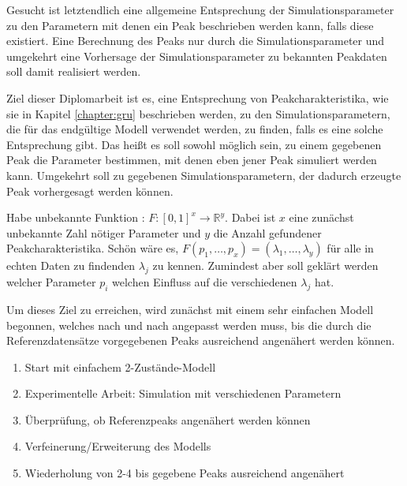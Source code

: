 
Gesucht ist letztendlich eine allgemeine Entsprechung der Simulationsparameter zu den Parametern mit denen ein Peak beschrieben werden kann, falls diese existiert. Eine Berechnung des Peaks nur durch die Simulationsparameter und umgekehrt eine Vorhersage der Simulationsparameter zu bekannten Peakdaten soll damit realisiert werden.

Ziel dieser Diplomarbeit ist es, eine Entsprechung von Peakcharakteristika, wie sie in Kapitel \ref{chapter:gru} beschrieben werden, zu den Simulationsparametern, die für das endgültige Modell verwendet werden, zu finden, falls es eine solche Entsprechung gibt.
Das heißt es soll sowohl möglich sein, zu einem gegebenen Peak die Parameter bestimmen, mit denen eben jener Peak simuliert werden kann. Umgekehrt soll zu gegebenen Simulationsparametern, der dadurch erzeugte Peak vorhergesagt werden können.
 
Habe unbekannte Funktion : $F: [0,1] ^ x \rightarrow \mathbb{R}^y$. Dabei ist $x$ eine zunächst unbekannte Zahl nötiger Parameter und $y$ die Anzahl gefundener Peakcharakteristika. Schön wäre es, $F(p_1, \ldots, p_x) = (\lambda_1, \ldots, \lambda_y)$ für alle in echten Daten zu findenden $\lambda_j$ zu kennen. Zumindest aber soll geklärt werden welcher Parameter $p_i$ welchen Einfluss auf die verschiedenen $\lambda_j$ hat. 

Um dieses Ziel zu erreichen, wird zunächst mit einem sehr einfachen Modell begonnen, welches nach und nach angepasst werden muss, bis die durch die Referenzdatensätze vorgegebenen Peaks ausreichend angenähert werden können.

\begin{enumerate}
 \item Start mit einfachem 2-Zustände-Modell
 \item Experimentelle Arbeit: Simulation mit verschiedenen Parametern
 \item Überprüfung, ob Referenzpeaks angenähert werden können
 \item Verfeinerung/Erweiterung des Modells
 \item Wiederholung von 2-4 bis gegebene Peaks ausreichend angenähert
\end{enumerate}

